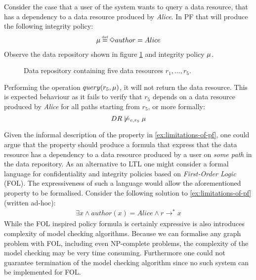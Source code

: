 \begin{example}\label{ex:limitations-of-pf}
Consider the case that a user of the system wants to query a data resource, that has a dependency to a data resource produced by \emph{Alice}. In PF that will produce the following integrity policy:
\begin{align*}
    \inte \eqdef \F author = Alice
\end{align*}
Observe the data repository shown in figure \ref{fig:pf-limitations} and integrity policy $\mu$.
\begin{figure}[!ht]
    \centering
    
    \caption{Data repository containing five data resources $r_1,\ldots,r_5$.}
    \label{fig:pf-limitations}
\end{figure}
Performing the operation $query(r_5, \mu)$, it will not return the data resource. This is expected behaviour as it fails to verify that $r_5$ depends on a data resource produced by \emph{Alice} for all paths starting from $r_5$, or more formally:
\begin{equation*}
    DR \not\models_{c,r_5} \mu
\end{equation*}
\end{example}
Given the informal description of the property in \autoref{ex:limitations-of-pf}, one could argue that the property should produce a formula that express that the data resource has a dependency to a data resource produced by a user on \emph{some path} in the data repository. As an alternative to LTL one might consider a formal language for confidentiality and integrity policies based on \emph{First-Order Logic} (FOL). The expressiveness of such a language would allow the aforementioned property to be formalised. Consider the following solution to \autoref{ex:limitations-of-pf} (written ad-hoc):
\begin{align*}
    \exists x \land author(x) = Alice \land r \longrightarrow^\ast x
\end{align*}
While the FOL inspired policy formula is certainly expressive is also introduces complexity of model checking algorithms. Because we can formalise any graph problem with FOL, including even NP-complete problems, the complexity of the model checking may be very time consuming. Furthermore one could not guarantee termination of the model checking algorithm since no such system can be implemented for FOL\cite{church1936note}.

